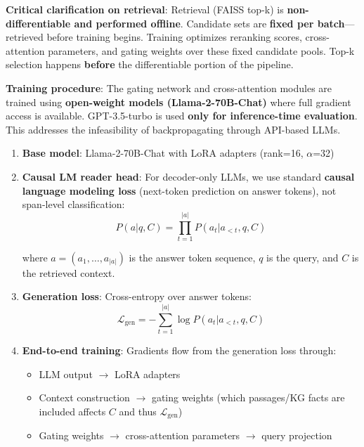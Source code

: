 \documentclass[10pt,twocolumn]{article}
\begin{document}
\textbf{Critical clarification on retrieval}: Retrieval (FAISS top-k) is \textbf{non-differentiable and performed offline}. Candidate sets are \textbf{fixed per batch}---retrieved before training begins. Training optimizes reranking scores, cross-attention parameters, and gating weights over these fixed candidate pools. Top-k selection happens \textbf{before} the differentiable portion of the pipeline.

\textbf{Training procedure}: The gating network and cross-attention modules are trained using \textbf{open-weight models (Llama-2-70B-Chat)} where full gradient access is available. GPT-3.5-turbo is used \textbf{only for inference-time evaluation}. This addresses the infeasibility of backpropagating through API-based LLMs.

\begin{enumerate}
    \item \textbf{Base model}: Llama-2-70B-Chat with LoRA adapters \cite{hu2022lora} (rank=16, $\alpha$=32)
    
    \item \textbf{Causal LM reader head}: For decoder-only LLMs, we use standard \textbf{causal language modeling loss} (next-token prediction on answer tokens), not span-level classification:
    \begin{equation}
    P(a|q, C) = \prod_{t=1}^{|a|} P(a_t | a_{<t}, q, C)
    \label{eq:causal_lm}
    \end{equation}
    
    where $a = (a_1, \ldots, a_{|a|})$ is the answer token sequence, $q$ is the query, and $C$ is the retrieved context.
    
    \item \textbf{Generation loss}: Cross-entropy over answer tokens:
    \begin{equation}
    \mathcal{L}_{\text{gen}} = -\sum_{t=1}^{|a|} \log P(a_t | a_{<t}, q, C)
    \label{eq:gen_loss}
    \end{equation}
    
    \item \textbf{End-to-end training}: Gradients flow from the generation loss through:
    \begin{itemize}
        \item LLM output $\rightarrow$ LoRA adapters
        \item Context construction $\rightarrow$ gating weights (which passages/KG facts are included affects $C$ and thus $\mathcal{L}_{\text{gen}}$)
        \item Gating weights $\rightarrow$ cross-attention parameters $\rightarrow$ query projection
    \end{itemize}
    

\end{enumerate}
\end{document}
